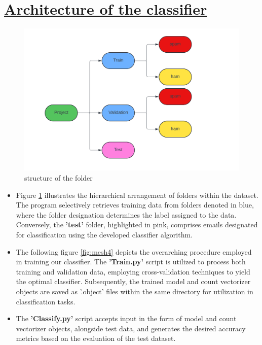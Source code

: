 \documentclass[12pt, a4paper]{article}
\newcommand{\ulsection}[1]{\texorpdfstring{\uline{#1}}{#1}}
\begin{document}
\section{\ulsection{Architecture of the classifier}}
\begin{figure}[ht]
    \centering
    \hfuzz=15pt \includegraphics[width=1.0\textwidth]{Folder_structure}
    \caption{\large structure of the folder}
    \label{fig:mesh3}
\end{figure}
\begin{itemize}
    \item \hfuzz=10pt \large Figure \ref{fig:mesh3} illustrates the hierarchical arrangement of folders within the dataset. The program selectively retrieves training data from folders denoted in blue, where the folder designation determines the label assigned to the data. Conversely, the \textbf{'test'} folder, highlighted in pink, comprises emails designated for classification using the developed classifier algorithm.
    \item The following figure \ref{fig:mesh4} depicts the overarching procedure employed in training our classifier. The \textbf{'Train.py'} script is utilized to process both training and validation data, employing cross-validation techniques to yield the optimal classifier. Subsequently, the trained model and count vectorizer objects are saved as '.object' files within the same directory for utilization in classification tasks.
    \item The \textbf{'Classify.py'} script accepts input in the form of model and count vectorizer objects, alongside test data, and generates the desired accuracy metrics based on the evaluation of the test dataset.
\end{itemize}
\end{document}

